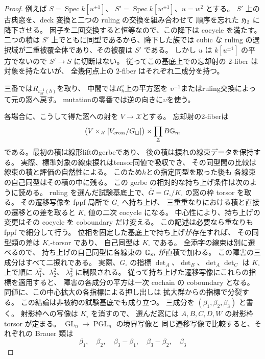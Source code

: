 \begin{proof}
例えば $S=\operatorname{Spec}k[u^{\pm1}]$、
$S'=\operatorname{Spec}k[w^{\pm1}]$、$u=w^2$ とする。
$S'$ 上の古典窓を、deck 変換と二つの ruling の交換を組み合わせて
順序を忘れた $\mathfrak H_2$ に降下させる。
因子を二回交換すると恒等なので、この降下は cocycle を満たす。
二つの積は $S'$ 上でともに同型であるから、降下した族では
cubic な ruling の選択域が二重被覆全体であり、その被覆は $S'$ である。
しかし $u$ は $k[u^{\pm1}]$ の平方でないので $S'\to S$ に切断はない。
従ってこの基底上での忘却射の $2$-fiber は対象を持たないが、
全幾何点上の $2$-fiber はそれぞれ二成分を持つ。

三番では$R_{\iota_M^{-1}(h)}$を取り、
中間では$R_h^{\mathrm c}$上の平方窓を
$\upsilon^{-1}$またはruling交換によって元の窓へ戻す。
mutationの零番では逆の向きに$\upsilon$を使う。

各場合に、こうして得た窓への射を
$V\to\mathcal X$とする。
忘却射の2-fiberは
\[
 \bigl(V\times_{\mathcal X}[V_{\mathrm{cross}}/G_\square]\bigr)
       \times\prod_{\mathbb Z}B\mathbb G_m
\]
である。最初の積は線形liftのgerbeであり、
後の積は捩れの線束データを保持する。
実際、標準対象の線束捩れはtensor同値で吸収でき、
その同型間の比較は線束の積と評価の自然性による。
このため$h$との指定同型を取った後も
各線束の自己同型はその積の中に残る。
この gerbe の相対的な持ち上げ条件は次のように読める。
ruling を選んだ試験基底上で、$\overline G=G_\square/K_\square$
の窓の枠 torsor を取る。
その遷移写像を fppf 局所で $G_\square$ へ持ち上げ、
三重重なりにおける積と直接の遷移との差を取ると
$K_\square$ 値の二次 cocycle になる。
中心性により、持ち上げの変更はその cocycle を coboundary だけ変える。
この記述は必要なら重なりも fppf で細分して行う。
位相を固定した基底上で持ち上げが存在すれば、
その同型類の差は $K_\square$-torsor であり、
自己同型は $K_\square$ である。
全添字の線束は別に選べるので、
持ち上げの自己同型に各線束の $\mathbb G_m$ が直積で加わる。
この障害の三成分はすべて二捩れである。
実際、$G_\square$ の指標
$\det_A$、$\det_B$、$\det_A\det_C$ は
$K_\square$ 上で順に $\lambda_1^2$、$\lambda_2^2$、
$\lambda_3^2$ に制限される。
従って持ち上げた遷移写像にこれらの指標を適用すると、
障害の各成分の平方は一次 cochain の coboundary となる。
同値に、この中心拡大の各指標による押し出しは
拡大群からの指標で分裂する。
この結論は非被約の試験基底でも成り立つ。
三成分を $(\beta_1,\beta_2,\beta_3)$ と書く。
射影枠への写像は $K_\square$ を消すので、
選んだ窓には $A,B,C,D,W$ の射影枠 torsor が定まる。
$\operatorname{GL}_n\to\operatorname{PGL}_n$ の境界写像と
同じ遷移写像で比較すると、それぞれの Brauer 類は
\[
 \beta_1,\quad \beta_2,\quad \beta_3-\beta_1,\quad
 \beta_3-\beta_2,\quad \beta_3
\]
\end{proof}
